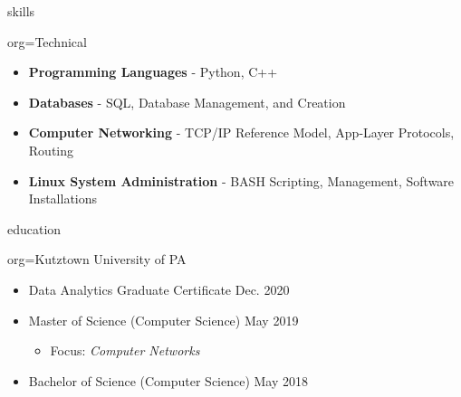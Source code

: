 \documentclass{resume}
\begin{document}
\begin{ResumeSection}{skills}
    \newcommand{\skill}[2]{\textbf{#1} - #2}
    \begin{ResumeSubsection}{org=Technical}
        \begin{itemize}
            \item \skill{Programming Languages}{Python, C++}
            \item \skill{Databases}{SQL, Database Management, and Creation}
            \item \skill{Computer Networking}{TCP/IP Reference Model, App-Layer Protocols, Routing}
            \item \skill{Linux System Administration}{BASH Scripting, Management, Software Installations}
        \end{itemize}
    \end{ResumeSubsection}
\end{ResumeSection}

\begin{ResumeSection}{education}
    \begin{ResumeSubsection}{org={Kutztown University of PA}}
        \begin{itemize}
            \item Data Analytics Graduate Certificate \hfill Dec. 2020
            \item Master of Science (Computer Science) \hfill May 2019
            \begin{itemize}
                \item Focus: \emph{Computer Networks}
            \end{itemize}
            \item Bachelor of Science (Computer Science) \hfill May 2018
        \end{itemize}
    \end{ResumeSubsection}
\end{ResumeSection}
\end{document}
